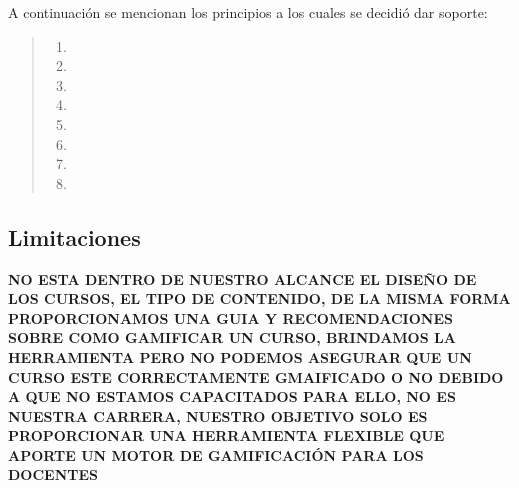     A continuación se mencionan los principios a los cuales se decidió dar soporte:
     
        \begin{quote}
        \begin{enumerate}
            \item \principioI
            \item \principioII
            \item \principioIII
            \item \principioIV
            \item \principioV
            \item \principioVI
            \item \principioVII
            \item \principioVIII
        \end{enumerate}
        \end{quote}


\subsection{Limitaciones}
\label{subsec:limitaciones}

{\bf\color{red} NO ESTA DENTRO DE NUESTRO ALCANCE EL DISEÑO DE LOS CURSOS, EL TIPO DE CONTENIDO, DE LA MISMA FORMA PROPORCIONAMOS UNA GUIA Y RECOMENDACIONES SOBRE COMO GAMIFICAR UN CURSO, BRINDAMOS LA HERRAMIENTA PERO NO PODEMOS ASEGURAR QUE UN CURSO ESTE CORRECTAMENTE GMAIFICADO O NO DEBIDO A QUE NO ESTAMOS CAPACITADOS PARA ELLO, NO ES NUESTRA CARRERA, NUESTRO OBJETIVO SOLO ES PROPORCIONAR UNA HERRAMIENTA FLEXIBLE QUE APORTE UN MOTOR DE GAMIFICACIÓN PARA LOS DOCENTES}

     

